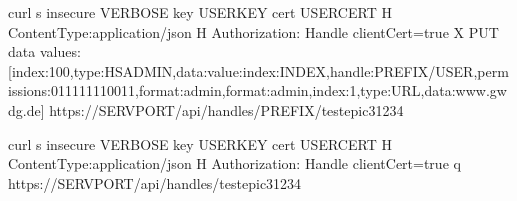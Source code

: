 \documentclass[a4paper,10pt,english]{sphinxmanual}
\begin{document}

\begin{sphinxVerbatim}[commandchars=\\\{\}]
curl \PYGZhy{}s \PYGZhy{}\PYGZhy{}insecure \PYGZdl{}\PYGZob{}VERBOSE\PYGZcb{} \PYGZhy{}\PYGZhy{}key \PYGZdl{}\PYGZob{}USERKEY\PYGZcb{} \PYGZhy{}\PYGZhy{}cert \PYGZdl{}\PYGZob{}USERCERT\PYGZcb{} \PYGZhy{}H \PYGZdq{}Content\PYGZhy{}Type:application/json\PYGZdq{} \PYGZhy{}H \PYGZsq{}Authorization: Handle clientCert=\PYGZdq{}true\PYGZdq{}\PYGZsq{} \PYGZhy{}X PUT \PYGZhy{}\PYGZhy{}data  \PYGZsq{}\PYGZob{}\PYGZdq{}values\PYGZdq{}:[\PYGZob{}\PYGZdq{}index\PYGZdq{}:100,\PYGZdq{}type\PYGZdq{}:\PYGZdq{}HS\PYGZus{}ADMIN\PYGZdq{},\PYGZdq{}data\PYGZdq{}:\PYGZob{}\PYGZdq{}value\PYGZdq{}:\PYGZob{}\PYGZdq{}index\PYGZdq{}:\PYGZsq{}\PYGZdl{}\PYGZob{}INDEX\PYGZcb{}\PYGZsq{},\PYGZdq{}handle\PYGZdq{}:\PYGZdq{}\PYGZsq{}\PYGZdl{}\PYGZob{}PREFIX\PYGZcb{}\PYGZsq{}\PYGZbs{}/\PYGZsq{}\PYGZdl{}\PYGZob{}USER\PYGZcb{}\PYGZsq{}\PYGZdq{},\PYGZdq{}permissions\PYGZdq{}:\PYGZdq{}011111110011\PYGZdq{},\PYGZdq{}format\PYGZdq{}:\PYGZdq{}admin\PYGZdq{}\PYGZcb{},\PYGZdq{}format\PYGZdq{}:\PYGZdq{}admin\PYGZdq{}\PYGZcb{}\PYGZcb{},\PYGZob{}\PYGZdq{}index\PYGZdq{}:1,\PYGZdq{}type\PYGZdq{}:\PYGZdq{}URL\PYGZdq{},\PYGZdq{}data\PYGZdq{}:\PYGZdq{}www.gwdg.de\PYGZdq{}\PYGZcb{}]\PYGZcb{}\PYGZsq{} https://\PYGZdl{}\PYGZob{}SERVPORT\PYGZcb{}/api/handles/\PYGZdl{}\PYGZob{}PREFIX\PYGZcb{}/test\PYGZus{}epic3\PYGZus{}1234
\end{sphinxVerbatim}


\begin{sphinxVerbatim}[commandchars=\\\{\}]
curl \PYGZhy{}s \PYGZhy{}\PYGZhy{}insecure \PYGZdl{}\PYGZob{}VERBOSE\PYGZcb{} \PYGZhy{}\PYGZhy{}key \PYGZdl{}\PYGZob{}USERKEY\PYGZcb{} \PYGZhy{}\PYGZhy{}cert \PYGZdl{}\PYGZob{}USERCERT\PYGZcb{} \PYGZhy{}H \PYGZdq{}Content\PYGZhy{}Type:application/json\PYGZdq{} \PYGZhy{}H \PYGZsq{}Authorization: Handle clientCert=\PYGZdq{}true\PYGZdq{}\PYGZsq{} \PYGZhy{}q https://\PYGZdl{}\PYGZob{}SERVPORT\PYGZcb{}/api/handles/test\PYGZus{}epic3\PYGZus{}1234
\end{sphinxVerbatim}

\end{document}
